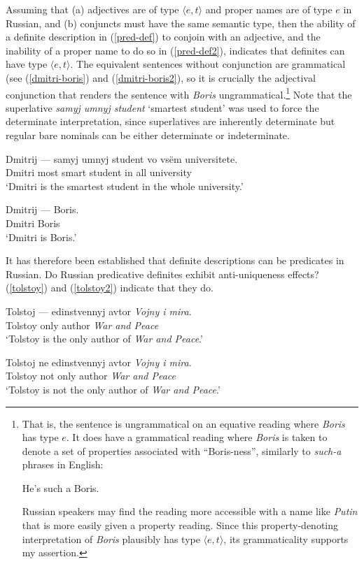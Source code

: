Assuming that (a) adjectives are of type $\langle e, t \rangle$ and proper names are of type $e$ in Russian, and (b) conjuncts must have the same semantic type, then the ability of a definite description in (\ref{pred-def}) to conjoin with an adjective, and the inability of a proper name to do so in (\ref{pred-def2}), indicates that definites can have type $\langle e, t \rangle$. The equivalent sentences without conjunction are grammatical (see (\ref{dmitri-boris}) and (\ref{dmitri-boris2}), so it is crucially the adjectival conjunction that renders the sentence with \textit{Boris} ungrammatical.\footnote{That is, the sentence is ungrammatical on an equative reading where \textit{Boris} has type $e$. It does have a grammatical reading where \textit{Boris} is taken to denote a set of properties associated with ``Boris-ness'', similarly to \textit{such-a} phrases in English: \begin{exe} \ex He's such a Boris.\end{exe} Russian speakers may find the reading more accessible with a name like \textit{Putin} that is more easily given a property reading. Since this property-denoting interpretation of \textit{Boris} plausibly has type $\langle e, t \rangle$, its grammaticality supports my assertion.} Note that the superlative \textit{samyj umnyj student} `smartest student' was used to force the determinate interpretation, since superlatives are inherently determinate but regular bare nominals can be either determinate or indeterminate.

\begin{exe}
	\ex \label{dmitri-boris} \gll Dmitrij --- samyj umnyj student vo vs\"{e}m universitete.\\
	Dmitri {} most smart student in all university\\
	\glt `Dmitri is the smartest student in the whole university.'

	\ex \label{dmitri-boris2} \gll Dmitrij --- Boris.\\
	Dmitri {} Boris\\
	\glt `Dmitri is Boris.'
\end{exe}

It has therefore been established that definite descriptions can be predicates in Russian. Do Russian predicative definites exhibit anti-uniqueness effects? (\ref{tolstoy}) and (\ref{tolstoy2}) indicate that they do.

\begin{exe}
	\ex \label{tolstoy} \gll Tolstoj --- edinstvennyj avtor \textit{Vojny i mira}.\\
	Tolstoy {} only author \textit{War and Peace}\\
	\glt `Tolstoy is the only author of \textit{War and Peace}.'

	\ex \label{tolstoy2} \gll Tolstoj ne edinstvennyj avtor \textit{Vojny i mira}.\\
	Tolstoy not only author \textit{War and Peace}\\
	\glt `Tolstoy is not the only author of \textit{War and Peace}.'
\end{exe}

